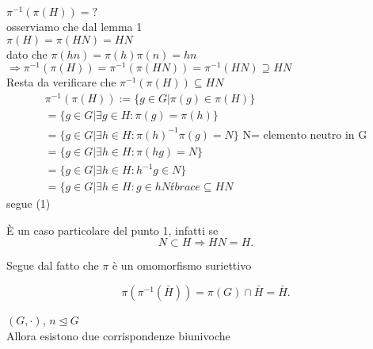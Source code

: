 \documentclass[12px]{article}
\begin{document}
{\begin{lemm}
	  \end{lemm}
	  \begin{dimo}[1]
		  $\pi^{-1}(\pi(H)) = ?$\\
		  osserviamo che dal lemma 1\\
		   $\pi(H) = \pi(HN) = HN$\\
		   dato che  $\pi(hn) = \pi(h)\pi(n) = hn$\\
		   $ \Rightarrow \pi^{-1}(\pi(H)) = \pi^{-1}(\pi(HN)) = \pi^{-1}(HN)\supseteq HN$ \\
		   Resta da verificare che $\pi^{-1}(\pi(H))\subseteq HN$\\
		    \begin{gather*}
			    \pi^{-1}(\pi(H)):=\lbrace g\in G|\pi(g)\in \pi(H)\rbrace\\
			    =\lbrace g\in G|\exists g\in H:\pi(g) = \pi(h)\rbrace\\
			    =\lbrace g\in G| \exists h\in H: \pi(h)^{-1}\pi(g)=N\rbrace \text{ N= elemento neutro in G}\\
			    =\lbrace g\in G|\exists h\in H: \pi(hg) = N\rbrace\\
			    =\lbrace g\in G | \exists h\in H: h^{-1}g\in N\rbrace\\
			    =\lbrace g\in G | \exists h\in H: g\in hNŕbrace \subseteq HN
		   \end{gather*}
		   segue (1)
	  \end{dimo}
	  \begin{dimo}[2]
	  	È un caso particolare del punto 1, infatti se
		\[
		N\subset H \Rightarrow HN = H
		.\] 
	  \end{dimo}
	  \begin{dimo}[3]
	  	Segue dal fatto che $\pi$ è un omomorfismo suriettivo 
		
		 \[
			 \pi(\pi^{-1}(\bar H))=\pi (G)\cap \bar H = \bar H
		.\] 
	  \end{dimo}
	  \begin{teo}
		$(G,\cdot)$, $n\trianglelefteq G$\\
		Allora esistono due corrispondenze biunivoche
		 \begin{center}
		 	

\end{center}
\end{teo}}
\end{document}

